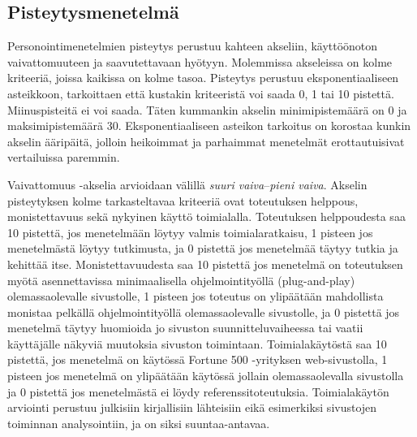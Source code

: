 \documentclass[finnish, 12pt, a4paper, elec, utf8, a-1b, online]{aaltothesis}
\begin{document}
\subsection{Pisteytysmenetelmä}

Personointimenetelmien pisteytys perustuu kahteen akseliin, käyttöönoton
vaivattomuuteen ja saavutettavaan hyötyyn. Molemmissa akseleissa on kolme
kriteeriä, joissa kaikissa on kolme tasoa. Pisteytys perustuu eksponentiaaliseen
asteikkoon, tarkoittaen että kustakin kriteeristä voi saada 0, 1 tai 10
pistettä. Miinuspisteitä ei voi saada. Täten kummankin akselin minimipistemäärä
on 0 ja maksimipistemäärä 30. Eksponentiaaliseen asteikon tarkoitus on korostaa
kunkin akselin ääripäitä, jolloin heikoimmat ja parhaimmat menetelmät
erottautuisivat vertailuissa paremmin.

Vaivattomuus -akselia arvioidaan välillä \textit{suuri vaiva}--\textit{pieni
vaiva}. Akselin pisteytyksen kolme tarkasteltavaa kriteeriä ovat toteutuksen
helppous, monistettavuus sekä nykyinen käyttö toimialalla. Toteutuksen
helppoudesta saa 10 pistettä, jos menetelmään löytyy valmis toimialaratkaisu, 1
pisteen jos menetelmästä löytyy tutkimusta, ja 0 pistettä jos menetelmää täytyy
tutkia ja kehittää itse. Monistettavuudesta saa 10 pistettä jos menetelmä on
toteutuksen myötä asennettavissa minimaalisella ohjelmointityöllä
(plug-and-play) olemassaolevalle sivustolle, 1 pisteen jos toteutus on
ylipäätään mahdollista monistaa pelkällä ohjelmointityöllä olemassaolevalle
sivustolle, ja 0 pistettä jos menetelmä täytyy huomioida jo sivuston
suunnitteluvaiheessa tai vaatii käyttäjälle näkyviä muutoksia sivuston
toimintaan. Toimialakäytöstä saa 10 pistettä, jos menetelmä on käytössä Fortune
500 -yrityksen web-sivustolla, 1 pisteen jos menetelmä on ylipäätään käytössä
jollain olemassaolevalla sivustolla ja 0 pistettä jos menetelmästä ei löydy
referenssitoteutuksia. Toimialakäytön arviointi perustuu julkisiin kirjallisiin
lähteisiin eikä esimerkiksi sivustojen toiminnan analysointiin, ja on siksi
suuntaa-antavaa.
\end{document}
